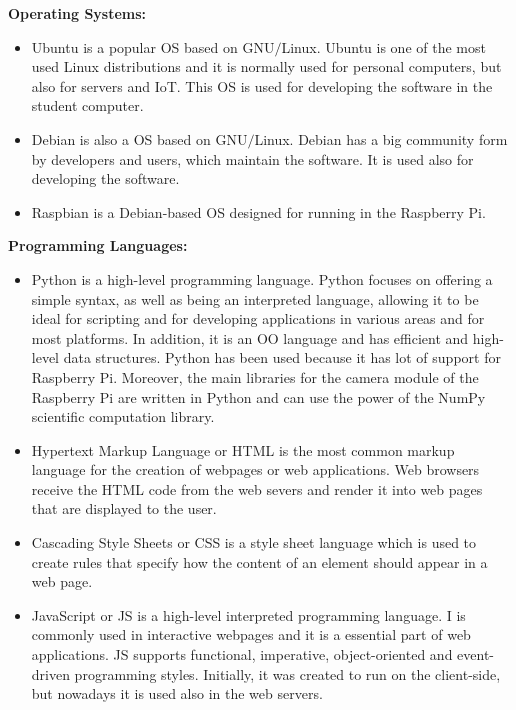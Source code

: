\textbf{Operating Systems:}
\begin{itemize}
	\item {} Ubuntu is a popular \ac{OS} based on \ac{GNU}$/$Linux. Ubuntu is one of the most used Linux distributions and it is normally used for personal computers, but also for servers and \ac{IoT}. This \ac{OS} is used for developing the software in the student computer.
	
	\item {} Debian is also a \ac{OS} based on \ac{GNU}$/$Linux. Debian has a big community form by developers and users, which maintain the software. It is used also for developing the software.
	
	\item {} Raspbian is a Debian-based \ac{OS} designed for running in the Raspberry Pi.
	
	
\end{itemize}

\textbf{Programming Languages:}
\begin{itemize}
	\item {} Python is a high-level programming language. Python focuses on offering a simple syntax, as well as being an interpreted language, allowing it to be ideal for scripting and for developing applications in various areas and for most platforms. In addition, it is an \ac{OO} language and has efficient and high-level data structures. Python has been used because it has lot of support for Raspberry Pi. Moreover, the main libraries for the camera module of the Raspberry Pi are written in Python and can use the power of the NumPy scientific computation library.
	
	\item {} Hypertext Markup Language or HTML is the most common markup language for the creation of webpages or web applications. Web browsers receive the HTML code from the web severs and render it into web pages that are displayed to the user.
	
	\item {} Cascading Style Sheets or CSS is a style sheet language which is used to create rules that specify how the content of an element should appear in a web page.
	
	\item {} JavaScript or JS is a high-level interpreted programming language. I is commonly used in interactive webpages and it is a essential part of web applications. JS supports functional, imperative, object-oriented and event-driven programming styles. Initially, it was created to run on the client-side, but nowadays it is used also in the web servers.
	
\end{itemize}


